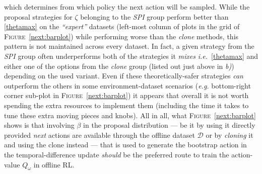 which determines from which policy the next action will be sampled.
While the proposal strategies for $\zeta$ belonging to the \textit{SPI} group perform better than
\ref{thetamax} on the \textit{``expert''} datasets (left-most column of plots
in the grid of \textsc{Figure}~\ref{next:barplot}) while performing worse than the \textit{clone} methods,
this pattern is not maintained across every dataset.
In fact, a given strategy from the \textit{SPI} group often underperforms both of the strategies it \emph{mixes}
\textit{i.e.}~\ref{thetamax} and either one of the options from the \textit{clone} group
(listed out just above in \textit{b)})
depending on the used variant.
Even if these theoretically-safer strategies
\emph{can} outperform the others in some environment-dataset scenarios
(\textit{e.g.} bottom-right corner sub-plot in \textsc{Figure}~\ref{next:barplot})
it appears that overall it is not worth spending the extra resources to implement them
(including the time it takes to tune these extra moving pieces and knobs).
All in all, what \textsc{Figure}~\ref{next:barplot} shows is that involving $\beta$ in the proposal distribution
--- be it by using it directly provided \textit{next} actions are available through the offline dataset $\mathcal{D}$
or by \emph{cloning} it and using the clone instead ---
that is used to generate the bootstrap action in the temporal-difference update
\emph{should} be the preferred route to train the action-value $Q_\omega$ in offline RL.

